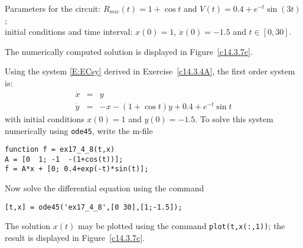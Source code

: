 \documentclass{ximera}
\begin{document}
\begin{computerExercise} \label{c14.3.7c}
Parameters for the circuit: $R_{mic}(t) = 1+\cos t$ and $V(t) = 0.4+e^{-t}\sin(3t)$;\\
initial conditions and time interval: $x(0) = 1$, $\dot{x}(0) = -1.5$ and 
$t\in[0,30]$.

\begin{solution}
\ans The numerically computed solution is displayed in 
Figure~\ref{c14.3.7c}.

\soln  Using the system \eqref{E:ECsy} derived in 
Exercise~\ref{c14.3.4A}, the first order system is:
\begin{eqnarray*}
\dot{x} & = & y \\
\dot{y} & = & -x - (1+\cos t)y + 0.4 + e^{-t}\sin t
\end{eqnarray*}
with initial conditions $x(0)=1$ and $y(0)=-1.5$. To solve this system numerically 
using {\tt ode45}, write the m-file
\begin{verbatim}
function f = ex17_4_8(t,x)
A = [0  1; -1  -(1+cos(t))];
f = A*x + [0; 0.4+exp(-t)*sin(t)];
\end{verbatim}
Now solve the differential equation using the command
\begin{verbatim}
[t,x] = ode45('ex17_4_8',[0 30],[1;-1.5]);
\end{verbatim}
The solution $x(t)$ may be plotted using the command {\tt plot(t,x(:,1))}; the 
result is displayed in Figure~\ref{c14.3.7c}.
\begin{figure}[htb]
     \centerline{%
     }
\end{figure} 



\end{solution}
\end{computerExercise}
\end{document}
